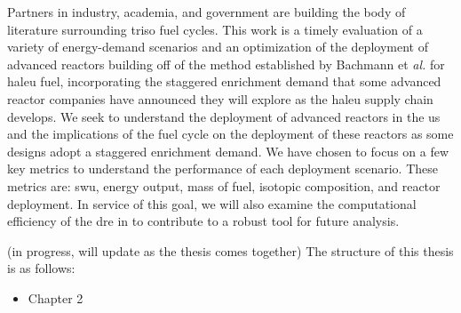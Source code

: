 Partners in industry, academia, and government are building the body of literature surrounding \gls{triso} fuel cycles. This work is a timely evaluation of a variety of energy-demand scenarios and an optimization of the deployment of advanced reactors building off of the method established by Bachmann et \textit{al.} \cite{bachmann_enrichment_2021} for \gls{haleu} fuel, incorporating the staggered enrichment demand that some advanced reactor companies have announced they will explore as the \gls{haleu} supply chain develops. We seek to understand the deployment of advanced reactors in the \gls{us} and the implications of the fuel cycle on the deployment of these reactors as some designs adopt a staggered enrichment demand. We have chosen to focus on a few key metrics to understand the performance of each deployment scenario. These metrics are: \gls{swu}, energy output, mass of fuel, isotopic composition, and reactor deployment. In service of this goal, we will also examine the computational efficiency of the \gls{dre} in \cyclus to contribute to a robust tool for future analysis.


\pagebreak

(in progress, will update as the thesis comes together)
The structure of this thesis is as follows:

\begin{itemize}
    \item Chapter 2
\end{itemize}